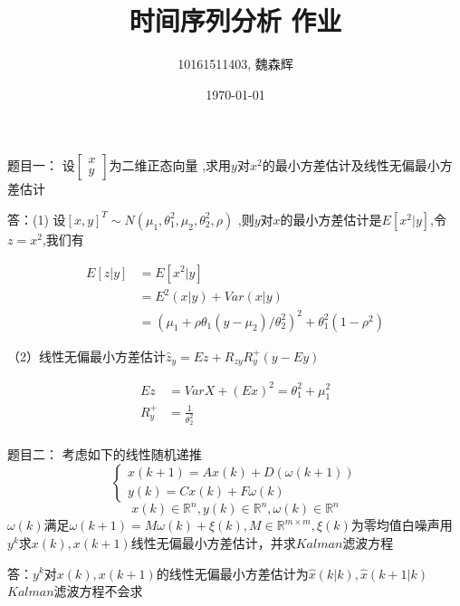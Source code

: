 \documentclass[12pt, a4paper]{ctexart}
\title{时间序列分析 作业}
\author{10161511403, 魏森辉}
\date{\today}
\begin{document}
\maketitle{}

\begin{flushleft}
    \qquad 题目一：
    设$\begin{bmatrix} x  \\ y \end{bmatrix}$为二维正态向量
    ,求用$y$对$x^2$的最小方差估计及线性无偏最小方差估计


    \qquad 答：(1) 设$[x, y]^T \sim  N(\mu_1,\theta_1 ^2, \mu_2, \theta_2 ^2, \rho)$ ,则$y$对$x$的最小方差估计是$E[x^2|y]$,令$z = x ^ 2$,我们有

    \[
    \begin{aligned}
    E[z|y] &= E[x^2|y] \\
    &= E^2(x|y) + Var(x|y) \\ 
    &=(\mu_1 + \rho \theta_1(y - \mu_2) / \theta_2 ^ 2 )^2 + \theta_1 ^2(1 - \rho^2)
    \end{aligned}
    \]
    
   （2）线性无偏最小方差估计$\hat{z}_{y} = Ez + R_{zy}R_{y}^{+}(y-Ey)$


    \[
    \begin{aligned}
     Ez &= VarX + (Ex)^2 = \theta_1 ^2 + \mu_1 ^2 \\
        R_y ^{+} &= \frac{1}{\theta_2 ^2}\\
    \end{aligned}
    \]


    \qquad 题目二：
    考虑如下的线性随机递推
    \[
    \left\{\begin{array}{ll}
    { x(k+1) = Ax(k) + D(\omega(k+1)) }  \\  %
    { y(k) = Cx(k)+F\omega(k) }
    \end{array}\right.
    \]
    \[
    x(k) \in \mathbb{R}^n, y(k) \in \mathbb{R}^n,\omega(k) \in \mathbb{R}^n 
    \]
    $\omega(k)$满足$\omega(k + 1) = M\omega(k) + \xi(k), M \in \mathbb{R}^{m \times m},\xi(k)$为零均值白噪声用$y^k$求$x(k),x(k + 1)$线性无偏最小方差估计，并求$Kalman$滤波方程

    \qquad 答：$y^k$对$x(k),x(k + 1)$的线性无偏最小方差估计为$\hat{x}(k | k), \hat{x} (k + 1 | k)$
    $Kalman$滤波方程不会求


\end{flushleft}
\end{document}
